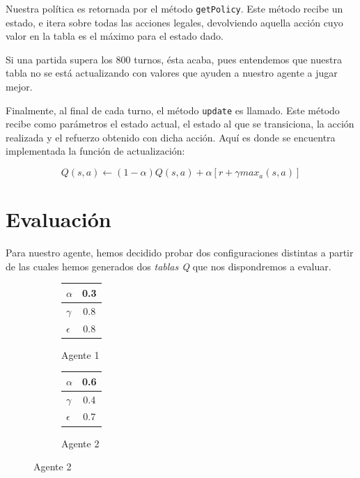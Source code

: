 \documentclass[12pt]{article}
\begin{document}
Nuestra política es retornada por el método \texttt{getPolicy}. Este método recibe un estado, e itera sobre todas las acciones legales, devolviendo aquella acción cuyo valor en la tabla es el máximo para el estado dado.

Si una partida supera los 800 turnos, ésta acaba, pues entendemos que nuestra tabla no se está actualizando con valores que ayuden a nuestro agente a jugar mejor.

Finalmente, al final de cada turno, el método \texttt{update} es llamado. Este método recibe como parámetros el estado actual, el estado al que se transiciona, la acción realizada y el refuerzo obtenido con dicha acción. Aquí es donde se encuentra implementada la función de actualización:

\begin{equation*}
	Q(s,a)\gets(1-\alpha) Q(s,a)+\alpha [r+\gamma max_a (s,a)]
\end{equation*}

\newpage
\section{Evaluación}
Para nuestro agente, hemos decidido probar dos configuraciones distintas a partir de las cuales hemos generados dos \textit{tablas Q} que nos dispondremos a evaluar.

\begin{figure}[h]
    \centering
    \begin{subfigure}{.5\textwidth}
        \centering
        \begin{tabular}{ l | c}
        	\hline
        	$\alpha$	& 0.3 \\ \hline
        	$\gamma$	& 0.8 \\ \hline
        	$\epsilon$	& 0.8 \\
        	\hline
        \end{tabular}
        \caption{Agente 1}
        \label{fig:sub1}
    \end{subfigure}%
    \begin{subfigure}{.5\textwidth}
        \centering
        \begin{tabular}{ l | c}
        	\hline
        	$\alpha$	& 0.6 \\ \hline
        	$\gamma$	& 0.4 \\ \hline
        	$\epsilon$	& 0.7 \\
        	\hline
        \end{tabular}
        \caption{Agente 2}
        \label{fig:sub2}
    \end{subfigure}
\end{figure}
\end{document}
